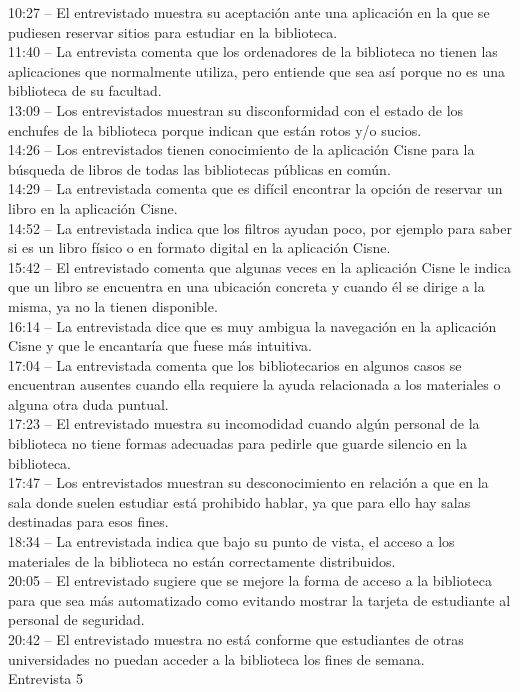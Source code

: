 \documentclass[12pt]{article}
\begin{document}
10:27 – El entrevistado muestra su aceptación ante una aplicación en la que se pudiesen reservar sitios para estudiar en la biblioteca.\\
11:40 – La entrevista comenta que los ordenadores de la biblioteca no tienen las aplicaciones que normalmente utiliza, pero entiende que sea así porque no es una biblioteca de su facultad.\\
13:09 – Los entrevistados muestran su disconformidad con el estado de los enchufes de la biblioteca porque indican que están rotos y/o sucios.\\
14:26 – Los entrevistados tienen conocimiento de la aplicación Cisne para la búsqueda de libros de todas las bibliotecas públicas en común.\\ 
14:29 – La entrevistada comenta que es difícil encontrar la opción de reservar un libro en la aplicación Cisne.\\
14:52 – La entrevistada indica que los filtros ayudan poco, por ejemplo para saber si es un libro físico o en formato digital en la aplicación Cisne.\\
15:42 – El entrevistado comenta que algunas veces en la aplicación Cisne le indica que un libro se encuentra en una ubicación concreta y cuando él se dirige a la misma, ya no la tienen disponible.\\
16:14 – La entrevistada dice que es muy ambigua la navegación en la aplicación Cisne y que le encantaría que fuese más intuitiva.\\ 
17:04 – La entrevistada comenta que los bibliotecarios en algunos casos se encuentran ausentes cuando ella requiere la ayuda relacionada a los materiales o alguna otra duda puntual.\\
17:23 – El entrevistado muestra su incomodidad cuando algún personal de la biblioteca no tiene formas adecuadas para pedirle que guarde silencio en la biblioteca.\\
17:47 – Los entrevistados muestran su desconocimiento en relación a que en la sala donde suelen estudiar está prohibido hablar, ya que para ello hay salas destinadas para esos fines.\\ 
18:34 – La entrevistada indica que bajo su punto de vista, el acceso a los materiales de la biblioteca no están correctamente distribuidos.\\
20:05 – El entrevistado sugiere que se mejore la forma de acceso a la biblioteca para que sea más automatizado como evitando mostrar la tarjeta de estudiante al personal de seguridad.\\
20:42 – El entrevistado muestra no está conforme que estudiantes de otras universidades no puedan acceder a la biblioteca los fines de semana.\\
Entrevista 5
 
\end{document}
